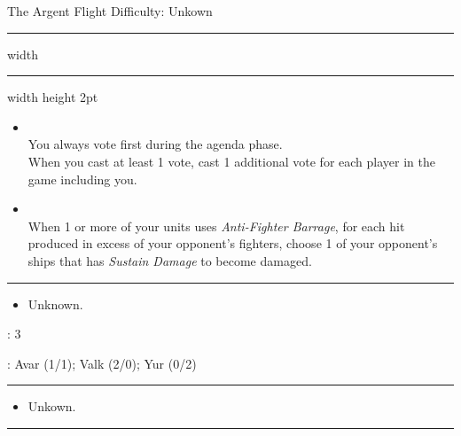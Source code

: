 \newpage
{\handel \Huge The Argent Flight} \hfill {\Large Difficulty: Unkown} \vspace{-4pt}\\
\hrule width \hsize \kern 1mm \hrule width \hsize height 2pt


\begin{multicols}{2}


\begin{itemize}
\item {}\\
You always vote first during the agenda phase.\\
When you cast at least 1 vote, cast 1 additional vote for each player in the game including you.
\item {}\\
When 1 or more of your units uses \emph{Anti-Fighter Barrage}, for each hit produced in excess of your opponent's fighters, choose 1 of your opponent's ships that has \emph{Sustain Damage} to become damaged.
\end{itemize}


\vspace{-10pt}\rule{\hsize}{0.4pt}\vspace{5pt}


\vspace{-5pt}
\begin{multicols}{2}
\begin{itemize}
\item Unknown. %
\end{itemize}
\end{multicols}

\vspace{-5pt}
: 3

\vspace{2pt}
: Avar (1/1); Valk (2/0); Yur (0/2)

\rule{\hsize}{0.4pt}\vspace{5pt}


\begin{itemize}
\item Unkown. %
\end{itemize}

\vspace{-10pt}\rule{\hsize}{0.4pt}\vspace{5pt}


\end{multicols}

